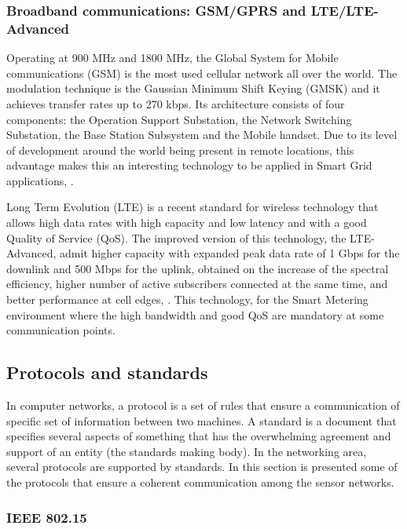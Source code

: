 \subsubsection{Broadband communications: GSM/GPRS and LTE/LTE-Advanced}

Operating at 900 MHz and 1800 MHz, the Global System for Mobile communications (GSM) is the most used cellular network all over the world. The modulation technique is the Gaussian Minimum Shift Keying (GMSK) and it achieves transfer rates up to 270 kbps. Its architecture consists of four components: the Operation Support Substation, the Network Switching Substation, the Base Station Subsystem and the Mobile handset. Due to its level of development around the world being present in remote locations, this advantage makes this  an interesting technology to be applied in Smart Grid applications, \cite{Usman2013}.

Long Term Evolution (LTE) is a recent standard for wireless technology that allows high data rates with high capacity and low latency and with a good Quality of Service (QoS). The improved version of this technology, the LTE-Advanced, admit higher capacity with expanded peak data rate of 1 Gbps for the downlink and 500 Mbps for the uplink, obtained on the increase of the spectral efficiency, higher  number of active subscribers connected at the same time, and better performance at cell edges, \cite{Mohassel2014}. This technology, for the Smart Metering environment where the high bandwidth and good QoS are mandatory at some communication points.


\subsection{Protocols and standards}

In computer networks, a protocol is a set of rules that ensure a communication of specific set of information between two machines. A standard is a document that specifies several aspects of something that has the overwhelming agreement and support of an entity (the standards making body). In the networking area, several protocols are supported by standards. In this section is presented some of the protocols that ensure a coherent communication among the sensor networks.

\subsubsection{IEEE 802.15}

